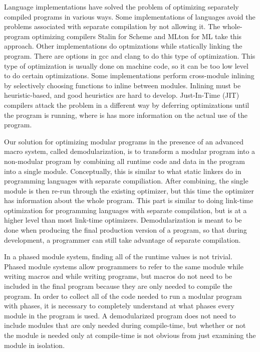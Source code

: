 Language implementations have solved the problem of optimizing separately compiled programs in various ways.
Some implementations of languages avoid the problems associated with separate compilation by not allowing it. 
The whole-program optimizing compilers Stalin \cite{stalin} for Scheme and MLton \cite{mlton} for ML take this approach.
Other implementations do optmizations while statically linking the program.
There are options in gcc \cite{gcc} and clang \cite{clang} to do this type of optimization.
This type of optimization is usually done on machine code, so it can be too low level to do certain optimizations.
Some implementations perform cross-module inlining by selectively choosing functions to inline between modules.
Inlining must be heuristic-based, and good heuristics are hard to develop. 
Just-In-Time (JIT) compilers attack the problem in a different way by deferring optimizations until the program is running, where is has more information on the actual use of the program.

Our solution for optimizing modular programs in the presence of an advanced macro system, called demodularization, is to transform a modular program into a non-modular program by combining all runtime code and data in the program into a single module.
Conceptually, this is similar to what static linkers do in programming languages with separate compiliation.
After combining, the single module is then re-run through the existing optimizer, but this time the optimizer has information about the whole program.
This part is similar to doing link-time optimization for programming languages with separate compilation, but is at a higher level than most link-time optimizers.
Demodularization is meant to be done when producing the final production version of a program, so that during development, a programmer can still take advantage of separate compilation.

In a phased module system, finding all of the runtime values is not trivial.
Phased module systems allow programmers to refer to the same module while writing macros and while writing programs, but macros do not need to be included in the final program because they are only needed to compile the program.
In order to collect all of the code needed to run a modular program with phases, it is necessary to completely understand at what phases every module in the program is used. 
A demodularized program does not need to include modules that are only needed during compile-time, but whether or not the module is needed only at compile-time is not obvious from just examining the module in isolation. 

